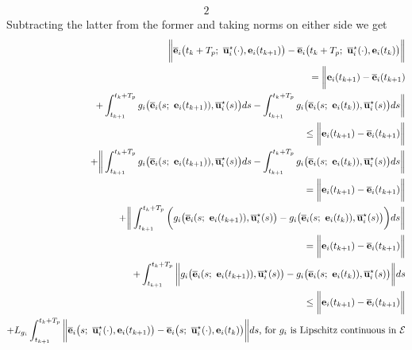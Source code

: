 \begin{gg_box}
\begin{alignat}{2}
  \end{alignat}
  Subtracting the latter from the former and taking norms on either side we get
  \begin{alignat}{2}
    \bigg \|\overline{\vect{e}}_i\big(t_k + T_p;\ \overline{\vect{u}}_i^{\star}(\cdot), \vect{e}_i(t_{k+1})\big)
      - \overline{\vect{e}}_i\big(t_k + T_p;\ \overline{\vect{u}}_i^{\star}(\cdot), \vect{e}_i(t_k)\big) \bigg\| \\
    = \bigg \| \vect{e}_i(t_{k+1}) - \overline{\vect{e}}_i(t_{k+1}) \\
    + \int_{t_{k+1}}^{t_k + T_p} g_i\big(\overline{\vect{e}}_i(s;\ \vect{e}_i(t_{k+1})), \overline{\vect{u}}_i^{\star}(s) \big)ds
      - \int_{t_{k+1}}^{t_k + T_p} g_i\big(\overline{\vect{e}}_i(s;\ \vect{e}_i(t_k)), \overline{\vect{u}}_i^{\star}(s) \big)ds \bigg \| \\
    \leq \bigg \| \vect{e}_i(t_{k+1}) - \overline{\vect{e}}_i(t_{k+1}) \bigg\| \\
    + \bigg \| \int_{t_{k+1}}^{t_k + T_p} g_i\big(\overline{\vect{e}}_i(s;\ \vect{e}_i(t_{k+1})), \overline{\vect{u}}_i^{\star}(s) \big)ds
      - \int_{t_{k+1}}^{t_k + T_p} g_i\big(\overline{\vect{e}}_i(s;\ \vect{e}_i(t_k)), \overline{\vect{u}}_i^{\star}(s) \big)ds \bigg \| \\
    = \bigg \| \vect{e}_i(t_{k+1}) - \overline{\vect{e}}_i(t_{k+1}) \bigg\| \\
    + \bigg \| \int_{t_{k+1}}^{t_k + T_p} \bigg( g_i\big(\overline{\vect{e}}_i(s;\ \vect{e}_i(t_{k+1})), \overline{\vect{u}}_i^{\star}(s) \big)
    -  g_i\big(\overline{\vect{e}}_i(s;\ \vect{e}_i(t_k)), \overline{\vect{u}}_i^{\star}(s) \big) \bigg) ds \bigg \| \\
    = \bigg \| \vect{e}_i(t_{k+1}) - \overline{\vect{e}}_i(t_{k+1}) \bigg\| \\
    +  \int_{t_{k+1}}^{t_k + T_p} \bigg\| g_i\big(\overline{\vect{e}}_i(s;\ \vect{e}_i(t_{k+1})), \overline{\vect{u}}_i^{\star}(s) \big)
    -  g_i\big(\overline{\vect{e}}_i(s;\ \vect{e}_i(t_k)), \overline{\vect{u}}_i^{\star}(s) \big) \bigg\| ds \\
    \leq \bigg \| \vect{e}_i(t_{k+1}) - \overline{\vect{e}}_i(t_{k+1}) \bigg\| \\
    +  L_{g_i} \int_{t_{k+1}}^{t_k + T_p} \bigg\| \overline{\vect{e}}_i\big(s;\ \overline{\vect{u}}_i^{\star}(\cdot), \vect{e}_i(t_{k+1})\big)
    - \overline{\vect{e}}_i\big(s;\ \overline{\vect{u}}_i^{\star}(\cdot), \vect{e}_i(t_k)\big) \bigg\| ds \text{, for } g_i \text{ is Lipschitz continuous in } \mathcal{E}\\

\end{alignat}
\end{gg_box}
